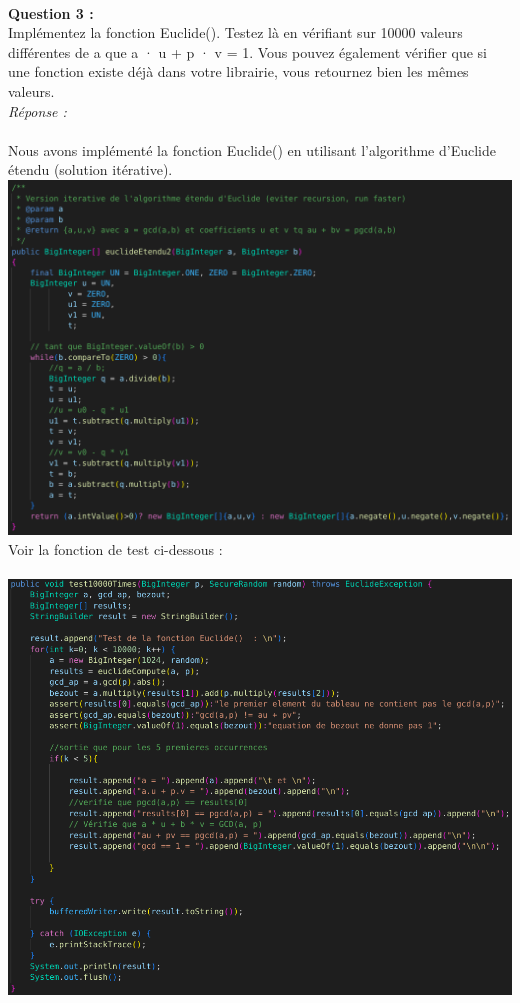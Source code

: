 \documentclass[a4paper,11pt]{article}
\begin{document}
        \textbf{\\Question 3 : \\}Implémentez la fonction Euclide(). Testez là en vérifiant sur 10000 valeurs différentes de a que a · u + p · v = 1. Vous pouvez également vérifier que si une fonction existe déjà dans votre librairie, vous retournez bien les mêmes valeurs.
        \textit{\\Réponse :} \\\\Nous avons implémenté la fonction Euclide() en utilisant l'algorithme d'Euclide étendu (solution itérative). \\\includegraphics[scale=0.4]{assets/euclide.png}\\Voir la fonction de test ci-dessous : \\\\\includegraphics[scale=0.3]{assets/testEucl.png}
        
\end{document}
